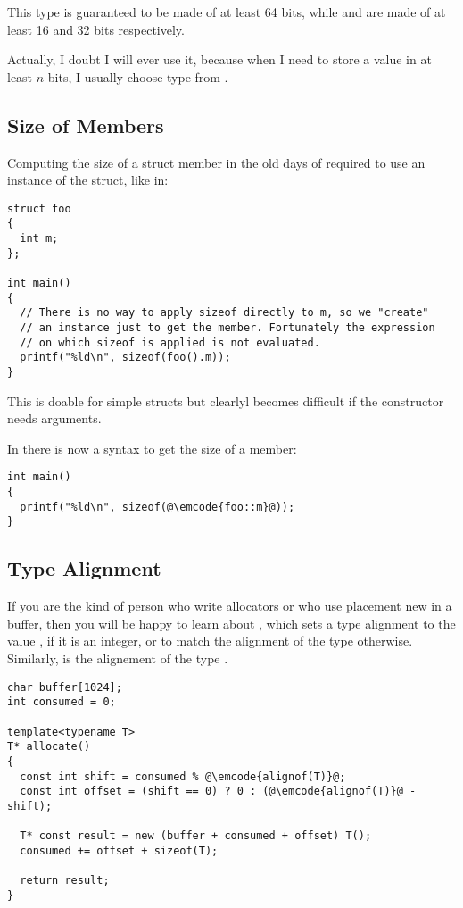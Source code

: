 This type is guaranteed to be made of at least 64 bits,
while  and  are made of at least 16 and 32
bits respectively.

Actually, I doubt I will ever use it, because when I need to store a
value in at least $n$ bits, I usually choose  type
from .

\subsection{Size of Members}

Computing the size of a struct member in the old days of \cpp{}
required to use an instance of the struct, like in:

\begin{lstlisting}
struct foo
{
  int m;
};

int main()
{
  // There is no way to apply sizeof directly to m, so we "create"
  // an instance just to get the member. Fortunately the expression
  // on which sizeof is applied is not evaluated.
  printf("%ld\n", sizeof(foo().m));
}
\end{lstlisting}

This is doable for simple structs but clearlyl becomes difficult if
the constructor needs arguments.

In  there is now a syntax to get the size of a member:

\begin{lstlisting}
int main()
{
  printf("%ld\n", sizeof(@\emcode{foo::m}@));
}
\end{lstlisting}

\subsection{Type Alignment}

If you are the kind of person who write allocators or who use
placement new in a buffer, then you will be happy to learn
about , which sets a type alignment to the
value , if it is an integer, or to match the alignment of the
type  otherwise. Similarly,  is the
alignement of the type .

\begin{lstlisting}
char buffer[1024];
int consumed = 0;

template<typename T>
T* allocate()
{
  const int shift = consumed % @\emcode{alignof(T)}@;
  const int offset = (shift == 0) ? 0 : (@\emcode{alignof(T)}@ - shift);

  T* const result = new (buffer + consumed + offset) T();
  consumed += offset + sizeof(T);

  return result;
}
\end{lstlisting}

